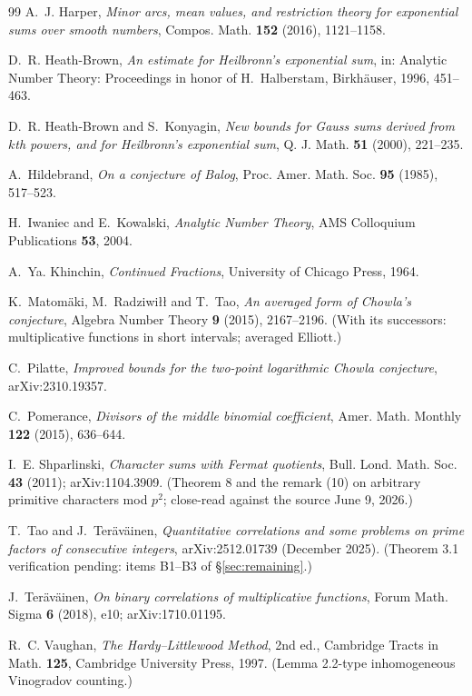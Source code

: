 \begin{thebibliography}{99}
 A.~J. Harper,
\emph{Minor arcs, mean values, and restriction theory for exponential
sums over smooth numbers}, Compos. Math. \textbf{152} (2016), 1121--1158.

 D.~R. Heath-Brown,
\emph{An estimate for Heilbronn's exponential sum},
in: Analytic Number Theory: Proceedings in honor of H.~Halberstam,
Birkh\"auser, 1996, 451--463.

 D.~R. Heath-Brown and S.~Konyagin,
\emph{New bounds for Gauss sums derived from $k$th powers, and for
Heilbronn's exponential sum}, Q. J. Math. \textbf{51} (2000), 221--235.

 A.~Hildebrand,
\emph{On a conjecture of Balog}, Proc. Amer. Math. Soc. \textbf{95}
(1985), 517--523.

 H.~Iwaniec and E.~Kowalski,
\emph{Analytic Number Theory}, AMS Colloquium Publications \textbf{53},
2004.

 A.~Ya. Khinchin, \emph{Continued Fractions},
University of Chicago Press, 1964.

 K.~Matom\"aki, M.~Radziwi\l\l{} and T.~Tao,
\emph{An averaged form of Chowla's conjecture},
Algebra Number Theory \textbf{9} (2015), 2167--2196.
(With its successors: multiplicative functions in short intervals;
averaged Elliott.)

 C.~Pilatte,
\emph{Improved bounds for the two-point logarithmic Chowla conjecture},
arXiv:2310.19357.

 C.~Pomerance,
\emph{Divisors of the middle binomial coefficient},
Amer. Math. Monthly \textbf{122} (2015), 636--644.

 I.~E. Shparlinski,
\emph{Character sums with Fermat quotients},
Bull. Lond. Math. Soc. \textbf{43} (2011);
arXiv:1104.3909. (Theorem 8 and the remark (10) on arbitrary primitive
characters mod $p^2$; close-read against the source June 9, 2026.)

 T.~Tao and J.~Ter\"av\"ainen,
\emph{Quantitative correlations and some problems on prime factors of
consecutive integers}, arXiv:2512.01739 (December 2025).
(Theorem 3.1 verification pending: items B1--B3 of
\S\ref{sec:remaining}.)

 J.~Ter\"av\"ainen,
\emph{On binary correlations of multiplicative functions},
Forum Math. Sigma \textbf{6} (2018), e10; arXiv:1710.01195.

 R.~C. Vaughan,
\emph{The Hardy--Littlewood Method}, 2nd ed., Cambridge Tracts in
Math. \textbf{125}, Cambridge University Press, 1997. (Lemma 2.2-type
inhomogeneous Vinogradov counting.)

\end{thebibliography}
